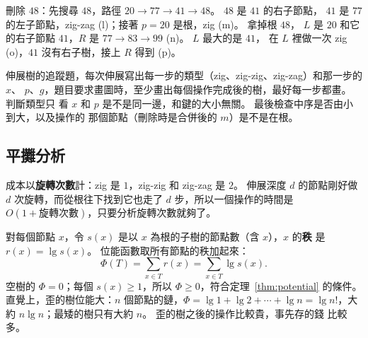\begin{figure}[htbp]
\hspace{1.2cm}
\label{fig:bal-splay-trace3}
\end{figure}

刪除 $48$：先搜尋 $48$，路徑 $20 \to 77 \to 41 \to 48$。 $48$ 是 $41$ 的右子節點，
$41$ 是 $77$ 的左子節點，zig-zag (l)；接著 $p = 20$ 是根，zig (m)。 拿掉根 $48$，
$L$ 是 $20$ 和它的右子節點 $41$，$R$ 是 $77 \to 83 \to 99$ (n)。 $L$ 最大的是 $41$，
在 $L$ 裡做一次 zig (o)，$41$ 沒有右子樹，接上 $R$ 得到 (p)。

\begin{examnote}
伸展樹的追蹤題，每次伸展寫出每一步的類型（zig、zig-zig、zig-zag）和那一步的 $x$、
$p$、$g$，題目要求畫圖時，至少畫出每個操作完成後的樹，最好每一步都畫。 判斷類型只
看 $x$ 和 $p$ 是不是同一邊，和鍵的大小無關。 最後檢查中序是否由小到大，以及操作的
那個節點（刪除時是合併後的 $m$）是不是在根。
\end{examnote}

\subsection{平攤分析}
\label{sec:bal-splay-amortized}

成本以\textbf{旋轉次數}計：zig 是 $1$，zig-zig 和 zig-zag 是 $2$。 伸展深度 $d$
的節點剛好做 $d$ 次旋轉，而從根往下找到它也走了 $d$ 步，所以一個操作的時間是
$O(1 + \text{旋轉次數})$，只要分析旋轉次數就夠了。

對每個節點 $x$，令 $s(x)$ 是以 $x$ 為根的子樹的節點數（含 $x$），$x$ 的\textbf{秩}
是 $r(x) = \lg s(x)$。 位能函數取所有節點的秩加起來：
\[
\Phi(T) = \sum_{x \in T} r(x) = \sum_{x \in T} \lg s(x).
\]
空樹的 $\Phi = 0$；每個 $s(x) \ge 1$，所以 $\Phi \ge 0$，符合定理~\ref{thm:potential}
的條件。 直覺上，歪的樹位能大：$n$ 個節點的鏈，$\Phi = \lg 1 + \lg 2 + \cdots + \lg n =
\lg n!$，大約 $n \lg n$；最矮的樹只有大約 $n$。 歪的樹之後的操作比較貴，事先存的錢
比較多。

